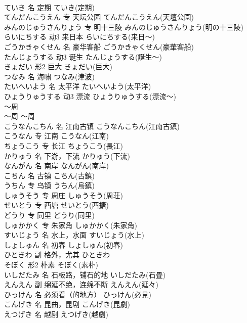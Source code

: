 \documentclass[8pt]{extreport}
\begin{document}
\begin{CJK}{UTF8}{min}
\\	ていき	名	定期	ていき(定期)	
\\	てんだんこうえん	专	天坛公园	てんだんこうえん(天壇公園)	
\\	みんのじゅうさんりょう	专	明十三陵	みんのじゅうさんりょう(明の十三陵)	
\\	らいにちする	动3	来日本	らいにちする(来日～)	
\\	ごうかきゃくせん	名	豪华客船	ごうかきゃくせん(豪華客船)	
\\	たんじょうする	动3	诞生	たんじょうする(誕生～)	
\\	きょだい	形2	巨大	きょだい(巨大)	
\\	つなみ	名	海啸	つなみ(津波)	
\\	たいへいよう	名	太平洋	たいへいよう(太平洋)	
\\	ひょうりゅうする	动3	漂流	ひょうりゅうする(漂流～)	
\\	～周	
\\	～周	～周	
\\	こうなんこちん	名	江南古镇	こうなんこちん(江南古鎮)	
\\	こうなん	专	江南	こうなん(江南)	
\\	ちょうこう	专	长江	ちょうこう(長江)	
\\	かりゅう	名	下游，下流	かりゅう(下流)	
\\	なんがん	名	南岸	なんがん(南岸)	
\\	こちん	名	古镇	こちん(古鎮)	
\\	うちん	专	乌镇	うちん(烏鎮)	
\\	しゅうそう	专	周庄	しゅうそう(周荘)	
\\	せいとう	专	西塘	せいとう(西搪)	
\\	どうり	专	同里	どうり(同里)	
\\	しゅかかく	专	朱家角	しゅかかく(朱家角)	
\\	すいじょう	名	水上，水面	すいじょう(水上)	
\\	しょしゅん	名	初春	しょしゅん(初春)	
\\	ひときわ	副	格外，尤其	ひときわ	
\\	そぼく	形2	朴素	そぼく(素朴)	
\\	いしだたみ	名	石板路，铺石的地	いしだたみ(石畳)	
\\	えんえん	副	绵延不绝，连绵不断	えんえん(延々)	
\\	ひっけん	名	必须看（的地方）	ひっけん(必見)	
\\	こんげき	名	昆曲，昆剧	こんげき(昆劇)	
\\	えつげき	名	越剧	えつげき(越劇)	

\end{CJK}
\end{document}
